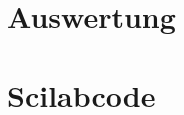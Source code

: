 

\section{Auswertung}
\begin{quote}
    
\end{quote} %



\section{Scilabcode}
\begin{quote}
%     


\end{quote} %












